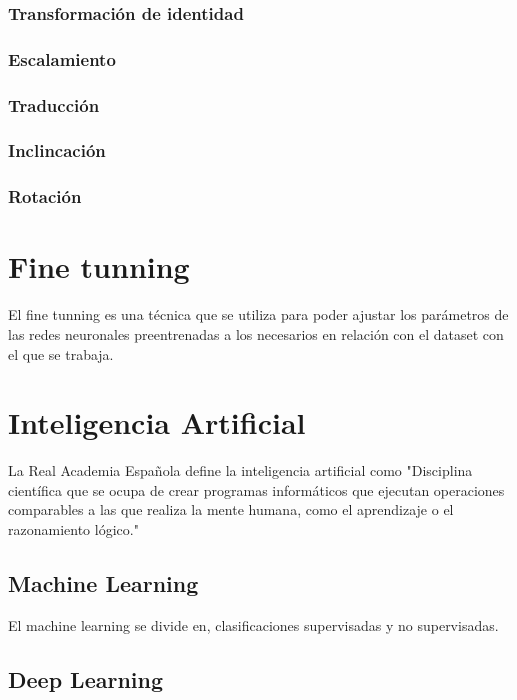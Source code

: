 \subsubsection{Transformación de identidad}

\subsubsection{Escalamiento}

\subsubsection{Traducción}

\subsubsection{Inclincación}

\subsubsection{Rotación}

\section{Fine tunning}
El fine tunning es una técnica que se utiliza para poder ajustar los parámetros de las redes neuronales preentrenadas a los necesarios en relación con
el dataset con el que se trabaja.

\section{Inteligencia Artificial}

La Real Academia Española define la inteligencia artificial como "Disciplina científica que se ocupa de crear programas informáticos que ejecutan 
operaciones comparables a las que realiza la mente humana, como el aprendizaje o el razonamiento lógico."

\subsection{Machine Learning}

El machine learning se divide en, clasificaciones supervisadas y no supervisadas.

\subsection{Deep Learning}

